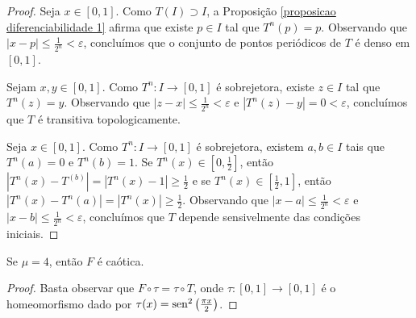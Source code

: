 \begin{proof}
Seja $x \in [0,1]$. Como $T(I) \supset I$, a Proposição \ref{proposicao diferenciabilidade 1} afirma que existe $p \in I$ tal que $T^n(p) = p$. Observando que $|x-p| \leq \frac{1}{2^n} < \varepsilon$, concluímos que o conjunto de pontos periódicos de $T$ é denso em $[0,1]$.

Sejam $x, y \in [0,1]$. Como $T^n: I \to [0,1]$ é sobrejetora, existe $z \in I$ tal que $T^n(z) = y$. Observando que $|z - x| \leq \frac{1}{2^n} < \varepsilon$ e $|T^n(z) - y| = 0 < \varepsilon$, concluímos que $T$ é transitiva topologicamente.

Seja $x \in [0,1]$.  Como $T^n: I \to [0,1]$ é sobrejetora, existem $a, b \in I$ tais que $T^n(a) = 0$ e $T^n(b) = 1$. Se $T^n(x) \in [0, \frac{1}{2}]$, então $|T^n(x) - T^(b)| = |T^n(x) - 1| \geq \frac{1}{2}$ e se $T^n(x) \in [\frac{1}{2}, 1]$, então $|T^n(x) - T^n(a)| = |T^n(x)| \geq \frac{1}{2}$. Observando que $|x - a| \leq \frac{1}{2^n} < \varepsilon$ e $|x - b| \leq \frac{1}{2^n} < \varepsilon$, concluímos que $T$ depende sensivelmente das condições iniciais.
\end{proof}

\begin{theorem}
Se $\mu = 4$, então $F$ é caótica.
\end{theorem}

\begin{proof}
Basta observar que $F \circ \tau = \tau \circ T$, onde $\tau: [0, 1] \to [0, 1]$ é o homeomorfismo dado por $\tau(x) = \operatorname{sen}^2\left(\frac{\pi x}{2}\right)$.
\end{proof}
